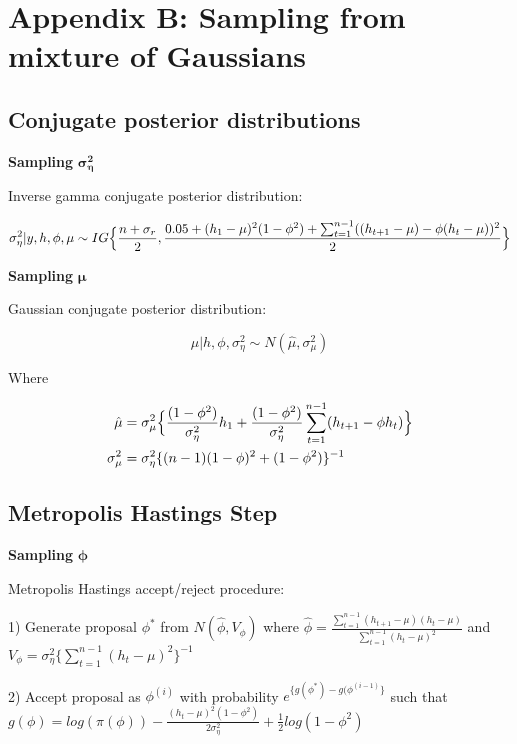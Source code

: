 \documentclass[12pt, a4paper]{article}
\begin{document}
\newpage

\section{Appendix B: Sampling from mixture of Gaussians}

\subsection*{Conjugate posterior distributions}

\textbf{Sampling} $\boldsymbol{\sigma_{\eta}^2}$

Inverse gamma conjugate posterior distribution:

$$
\sigma^2_{\eta} | y,h,\phi,\mu \sim IG \Bigl\{\frac{n+\sigma_r}{2}, \frac{0.05 + (h_1 - \mu)^2 (1 - \phi^2) + \sum_{t=1}^{n-1}((h_{t+1} - \mu) - \phi(h_t - \mu))^2}{2}\Bigr\}
$$

\textbf{Sampling}  $\boldsymbol{\mu}$

Gaussian conjugate posterior distribution:

$$
\mu | h,\phi,\sigma^2_{\eta}  \sim N(\hat{\mu}, \sigma^2_{\mu})
$$

Where

$$
\begin{aligned}
\hat{\mu} &= \sigma^2_{\mu} \Bigl\{\frac{(1-\phi^2)}{\sigma_{\eta}^2}h_1 +\frac{(1-\phi^2)}{\sigma_{\eta}^2} \sum_{t=1}^{n-1} (h_{t+1} - \phi h_t)\Bigr\} \\
\sigma^2_{\mu} &= \sigma^2_{\eta} \{(n-1)(1-\phi)^2 + (1-\phi^2)\}^{-1}
\end{aligned}
$$

\subsection*{Metropolis Hastings Step}
\textbf{Sampling}  $\boldsymbol{\phi}$

Metropolis Hastings accept/reject procedure:

1) Generate proposal $\phi^\ast$ from $N(\hat{\phi}, V_{\phi})$ where $\hat{\phi} = \frac{\sum_{t=1}^{n-1} (h_{t+1} - \mu)(h_t - \mu)}{\sum_{t=1}^{n-1} (h_t - \mu)^2}$ and $V_{\phi} = \sigma^2_{\eta} \{\sum_{t=1}^{n-1} (h_t - \mu)^2\}^{-1}$

2) Accept proposal as $\phi^{(i)}$ with probability $e^{\{g(\phi^\ast) - g(\phi^{(i-1)}\}}$ such that $g(\phi) = log (\pi (\phi)) - \frac {(h_t - \mu)^2 (1-\phi^2)}{2 \sigma_{\eta}^2} + \frac{1}{2} log (1-\phi^2)$
\end{document}
